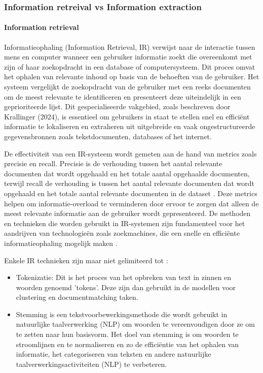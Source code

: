 \subsubsection{Information retreival vs Information extraction}
\paragraph{Information retrieval}
Informatieophaling (Information Retrieval, IR) verwijst naar de interactie tussen mens en computer wanneer een gebruiker informatie zoekt die overeenkomt met zijn of haar zoekopdracht in een database of computersysteem. Dit proces omvat het ophalen van relevante inhoud op basis van de behoeften van de gebruiker. Het systeem vergelijkt de zoekopdracht van de gebruiker met een reeks documenten om de meest relevante te identificeren en presenteert deze uiteindelijk in een geprioriteerde lijst. Dit gespecialiseerde vakgebied, zoals beschreven door Krallinger (2024), is essentieel om gebruikers in staat te stellen snel en efficiënt informatie te lokaliseren en extraheren uit uitgebreide en vaak ongestructureerde gegevensbronnen zoals tekstdocumenten, databases of het internet.

De effectiviteit van een IR-systeem wordt gemeten aan de hand van metrics zoals precisie en recall. Precisie is de verhouding tussen het aantal relevante documenten dat wordt opgehaald en het totale aantal opgehaalde documenten, terwijl recall de verhouding is tussen het aantal relevante documenten dat wordt opgehaald en het totale aantal relevante documenten in de dataset \autocite{Javija2024}. Deze metrics helpen om informatie-overload te verminderen door ervoor te zorgen dat alleen de meest relevante informatie aan de gebruiker wordt gepresenteerd. De methoden en technieken die worden gebruikt in IR-systemen zijn fundamenteel voor het aandrijven van technologieën zoals zoekmachines, die een snelle en efficiënte informatieophaling mogelijk maken \autocite{Krallinger2024}.

Enkele IR technieken zijn maar niet gelimiteerd tot \autocite{IBM2024}:
\begin{itemize}
  \item Tokenizatie: Dit is het proces van het opbreken van text in zinnen en woorden genoemd 'tokens'. Deze zijn dan gebruikt in de modellen voor clustering en documentmatching taken\autocite{IBM}.
  \item Stemming is een tekstvoorbewerkingsmethode die wordt gebruikt in natuurlijke taalverwerking (NLP) om woorden te vereenvoudigen door ze om te zetten naar hun basisvorm. Het doel van stemming is om woorden te stroomlijnen en te normaliseren en zo de efficiëntie van het ophalen van informatie, het categoriseren van teksten en andere natuurlijke taalverwerkingsactiviteiten (NLP) te verbeteren\autocite{SC2024}.
\end{itemize}

